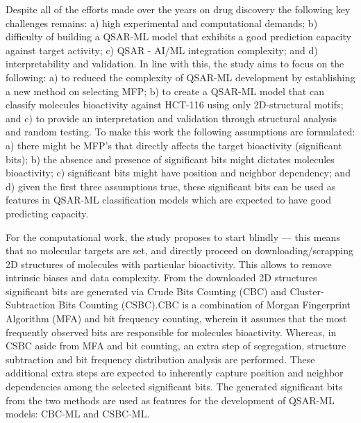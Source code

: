 Despite all of the efforts made over the years on drug discovery the following key challenges remains: a) high experimental and computational demands; b) difficulty of building a QSAR-ML model that exhibits a good prediction capacity against target activity; c) QSAR - AI/ML integration complexity; and d) interpretability and validation. In line with this, the study aims to focus on the following: a) to reduced the complexity of QSAR-ML development by establishing a new method on selecting MFP; b) to create a QSAR-ML model that can classify molecules bioactivity against HCT-116 using only 2D-structural motifs; and c) to provide an interpretation and validation through structural analysis and random testing. To make this work the following assumptions are formulated: a) there might be MFP's that directly affects the target bioactivity (significant bits); b) the absence and presence of significant bits might dictates molecules bioactivity; c) significant bits might have position and neighbor dependency; and d) given the first three assumptions true, these significant bits can be used as features in QSAR-ML classification models which are expected to have good predicting capacity.    

For the computational work, the study proposes to start blindly --- this means that no molecular targets are set, and directly proceed on downloading/scrapping 2D structures of molecules with particular bioactivity. This allows to remove intrinsic biases and data complexity. From the downloaded 2D structures significant bits are generated via Crude Bits Counting (CBC) and Cluster-Subtraction Bits Counting (CSBC).CBC is a combination of Morgan Fingerprint Algorithm (MFA) and bit frequency counting, wherein it assumes that the most frequently observed bits are responsible for molecules bioactivity. Whereas, in CSBC aside from MFA and bit counting, an extra step of segregation, structure subtraction and bit frequency distribution analysis are performed. These additional extra steps are expected to inherently capture position and neighbor dependencies among the selected significant bits. The generated significant bits from the two methods are used as features for the development of QSAR-ML models: CBC-ML and CSBC-ML. 



